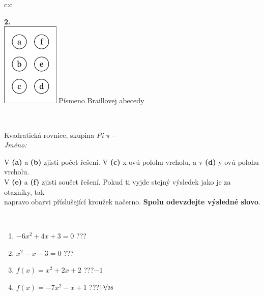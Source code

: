 \documentclass[10pt]{report}
\begin{document}
\begin{tabular}{c:c}
\begin{minipage}[c][104.5mm][t]{0.5\linewidth}
\begin{center}
\begin{minipage}{0.20\linewidth}
\begin{center}
{\Huge\bfseries 2.} \\[2mm]
\includegraphics[height=40mm]{../images/braille.png}
{\small Písmeno Braillovej abecedy}
\end{center}
\end{minipage}
\end{center}
\end{minipage}
\\ \hdashline
\begin{minipage}[c][104.5mm][t]{0.5\linewidth}
\begin{center}
\vspace{7mm}
{\huge Kvadratická rovnice, skupina \textit{Pi $\pi$} -}\\[5mm]
\textit{Jméno:}\phantom{xxxxxxxxxxxxxxxxxxxxxxxxxxxxxxxxxxxxxxxxxxxxxxxxxxxxxxxxxxxxxxxxx}\\[5mm]
\begin{minipage}{0.95\linewidth}
\begin{center}
V \textbf{(a)} a \textbf{(b)} zjisti počet řešení. V \textbf{(c)} x-ovú polohu vrcholu, a v \textbf{(d)} y-ovú polohu vrcholu.\\V \textbf{(e)} a \textbf{(f)} zjisti součet řešení. Pokud ti vyjde stejný výsledek jako je za otazníky, tak\\napravo obarvi příslušející kroužek načerno. \textbf{Spolu odevzdejte výsledné slovo}.
\end{center}
\end{minipage}
\\[1mm]
\begin{minipage}{0.79\linewidth}
\begin{center}
\begin{varwidth}{\linewidth}
\begin{enumerate}
\Large
\item $-6x^2+4x+3=0$\quad \dotfill\; ???\;\dotfill {}
\item $x^2-x-3=0$\quad \dotfill\; ???\;\dotfill {}
\item $f(x)=x^2+2x+2$\quad \dotfill\; ???\;\dotfill \quad $-1$
\item $f(x)=-7x^2-x+1$\quad \dotfill\; ???\;\dotfill \quad $\nicefrac{15}{28}$

\end{enumerate}
\end{varwidth}
\end{center}
\end{minipage}
\end{center}
\end{minipage}
\end{tabular}
\end{document}
